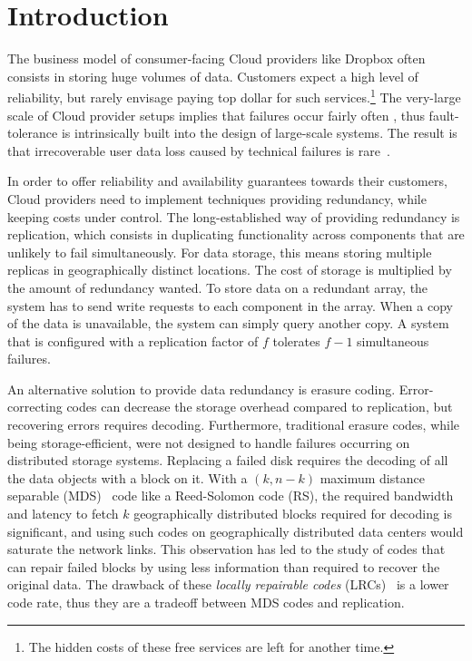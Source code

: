 \section{Introduction}
\label{sec:intro}

The business model of consumer-facing Cloud providers like Dropbox often consists in storing huge volumes of data. Customers expect a high level of reliability, but rarely envisage paying top dollar for such services.\footnote{The hidden costs of these free services are left for another time.} 
The very-large scale of Cloud provider setups implies that failures occur fairly often \autocite{failures-study}, thus fault-tolerance is intrinsically built into the design of large-scale systems. 
The result is that irrecoverable user data loss caused by technical failures is rare~\autocite{racs}.

In order to offer reliability and availability guarantees towards their customers, Cloud providers need to implement techniques providing redundancy, while keeping costs under control. 
The long-established way of providing redundancy is replication, which consists in duplicating functionality across components that are unlikely to fail simultaneously. 
For data storage, this means storing multiple replicas in geographically distinct locations. 
The cost of storage is multiplied by the amount of redundancy wanted. 
To store data on a redundant array, the system has to send write requests to each component in the array. 
When a copy of the data is unavailable, the system can simply query another copy. 
A system that is configured with a replication factor of $f$ tolerates $f-1$ simultaneous failures.

An alternative solution to provide data redundancy is erasure coding. 
Error-correcting codes can decrease the storage overhead compared to replication, but recovering errors requires decoding. 
Furthermore, traditional erasure codes, while being storage-efficient, were not designed to handle failures occurring on distributed storage systems. 
Replacing a failed disk requires the decoding of all the data objects with a block on it. With a $(k,n-k)$ maximum distance separable (MDS)~\autocite{lin2004error} code like a Reed-Solomon code (RS), the required bandwidth and latency to fetch $k$ geographically distributed blocks required for decoding is significant, and using such codes on geographically distributed data centers would saturate the network links. 
This observation has led to the study of codes that can repair failed blocks by using less information than required to recover the original data. 
The drawback of these \emph{locally repairable codes} (LRCs)~\autocite{papailiopoulos2014locally} is a lower code rate, thus they are a tradeoff between MDS codes and replication.

